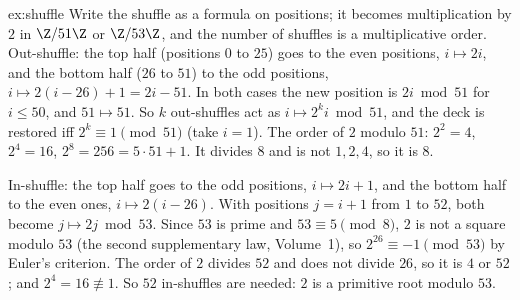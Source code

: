 \begin{solution}{ex:shuffle}
\idea Write the shuffle as a formula on positions; it becomes multiplication by $2$ in $\Z/51\Z$ or $\Z/53\Z$, and the number of shuffles is a multiplicative order.
\writeup Out-shuffle: the top half (positions $0$ to $25$) goes to the even positions, $i\mapsto2i$, and the bottom half ($26$ to $51$) to the odd positions, $i\mapsto2(i-26)+1=2i-51$. In both cases the new position is $2i\bmod51$ for $i\le50$, and $51\mapsto51$. So $k$ out-shuffles act as $i\mapsto2^ki\bmod51$, and the deck is restored iff $2^k\equiv1\pmod{51}$ (take $i=1$). The order of $2$ modulo $51$: $2^2=4$, $2^4=16$, $2^8=256=5\cdot51+1$. It divides $8$ and is not $1,2,4$, so it is $8$.

In-shuffle: the top half goes to the odd positions, $i\mapsto2i+1$, and the bottom half to the even ones, $i\mapsto2(i-26)$. With positions $j=i+1$ from $1$ to $52$, both become $j\mapsto2j\bmod53$. Since $53$ is prime and $53\equiv5\pmod8$, $2$ is not a square modulo $53$ (the second supplementary law, Volume~1), so $2^{26}\equiv-1\pmod{53}$ by Euler's criterion. The order of $2$ divides $52$ and does not divide $26$, so it is $4$ or $52$; and $2^4=16\not\equiv1$. So $52$ in-shuffles are needed: $2$ is a primitive root modulo $53$.
\end{solution}

